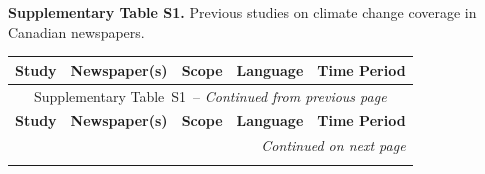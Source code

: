 \documentclass[12pt]{article}
\makeatletter
\let\CCFlandscape@orig\landscape
\renewcommand{\landscape}{%
  \CCFlandscape@orig
  \setlength{\textwidth}{\dimexpr\paperheight-5cm\relax}%
  \setlength{\linewidth}{\textwidth}%
  \setlength{\hsize}{\textwidth}%
  \setlength{\columnwidth}{\textwidth}%
}
\renewcommand\_{\texttt{\detokenize{_}\allowbreak}}
\makeatother
\begin{document}
\landscape
\noindent\textbf{Supplementary Table S1.} Previous studies on climate change coverage in Canadian newspapers.
\vspace{0.5em}
{\footnotesize
{}
\label{tab:literature_review}
\begin{longtable}{p{5cm}p{6cm}p{4cm}p{3cm}p{3.5cm}}
\toprule
\textbf{Study} & \textbf{Newspaper(s)} & \textbf{Scope} & \textbf{Language} & \textbf{Time Period} \\
\midrule
\endfirsthead
\multicolumn{5}{c}{Supplementary Table~S1\ -- \textit{Continued from previous page}} \\
\toprule
\textbf{Study} & \textbf{Newspaper(s)} & \textbf{Scope} & \textbf{Language} & \textbf{Time Period} \\
\midrule
\endhead
\midrule
\multicolumn{5}{r}{\textit{Continued on next page}} \\
\endfoot
\bottomrule
\endlastfoot


\end{longtable}}
\end{document}
